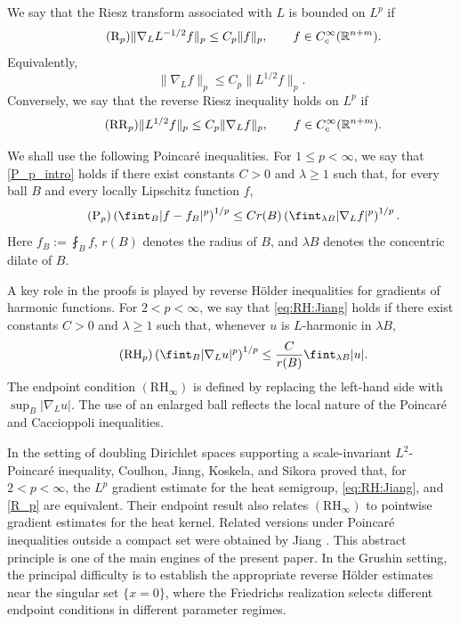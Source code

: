 \documentclass[12pt]{amsart}
\begin{document}
We say that the Riesz transform associated with $L$ is bounded on $L^p$ if
\begin{equation}\tag{$\mathrm{R}_p$}\label{R_p}
    \|\nabla_LL^{-1/2}f\|_p
    \leq
    C_p\|f\|_p,
    \qquad f\in C_c^\infty(\mathbb R^{n+m}).
\end{equation}
Equivalently, 
\begin{equation*}
    \|\nabla_L f\|_p
    \leq
    C_p\|L^{1/2}f\|_p.
\end{equation*}
Conversely, we say that the reverse Riesz inequality holds on $L^p$ if
\begin{equation}\tag{$\mathrm{RR}_p$}\label{RR_p}
    \|L^{1/2}f\|_p
    \leq
    C_p\|\nabla_L f\|_p,
    \qquad f\in C_c^\infty(\mathbb R^{n+m}).
\end{equation}

We shall use the following Poincar\'e inequalities. For $1\leq p<\infty$, we say that \eqref{P_p_intro} holds if there exist constants $C>0$ and $\lambda\geq1$ such that, for every ball $B$ and every locally Lipschitz function $f$,
\begin{equation}\tag{$\mathrm{P}_p$}\label{P_p_intro}
    \left(\fint_B|f-f_B|^p\right)^{1/p}
    \leq
    C r(B)
    \left(\fint_{\lambda B}|\nabla_Lf|^p\right)^{1/p}.
\end{equation}
Here $f_B:=\fint_Bf$, $r(B)$ denotes the radius of $B$, and $\lambda B$ denotes the concentric dilate of $B$. 

A key role in the proofs is played by reverse H\"older inequalities for gradients of harmonic functions. For $2<p<\infty$, we say that
\eqref{eq:RH:Jiang} holds if there exist constants $C>0$ and $\lambda\geq1$ such that, whenever $u$ is $L$-harmonic in $\lambda B$,
\begin{equation}\tag{$\mathrm{RH}_p$}\label{eq:RH:Jiang}
     \left(\fint_B|\nabla_Lu|^p\right)^{1/p}
     \leq
     \frac{C}{r(B)}
     \fint_{\lambda B}|u|.
\end{equation}
The endpoint condition $(\mathrm{RH}_\infty)$ is defined by replacing the left-hand side with $\operatorname*{sup}_B|\nabla_Lu|$. The use of an enlarged ball reflects the local nature of the Poincar\'e and Caccioppoli inequalities.

In the setting of doubling Dirichlet spaces supporting a scale-invariant $L^2$-Poincar\'e inequality, Coulhon, Jiang, Koskela, and Sikora \cite{CJKS} proved that, for $2<p<\infty$, the $L^p$ gradient estimate for the heat semigroup, \eqref{eq:RH:Jiang}, and \eqref{R_p} are equivalent. Their endpoint result also relates $(\mathrm{RH}_\infty)$ to pointwise gradient estimates for the heat kernel. Related versions under Poincar\'e inequalities outside a compact set were obtained by Jiang \cite{Jiang}. This abstract principle is one of the main engines of the present paper. In the Grushin setting, the principal difficulty is to establish the appropriate reverse H\"older estimates near the singular set $\{x=0\}$, where the Friedrichs realization selects different endpoint conditions in different parameter regimes.
\end{document}
